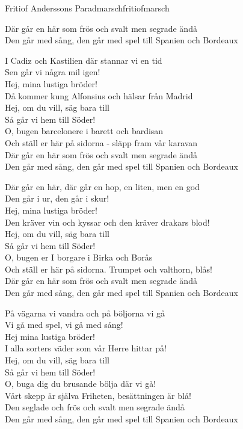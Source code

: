 \begin{song}{Fritiof Anderssons Paradmarsch}{fritiofmarsch}
\begin{vers}
Där går en här som frös och svalt men segrade ändå\\
Den går med sång, den går med spel till Spanien och Bordeaux\\
\end{vers}
\begin{vers}
I Cadiz och Kastilien där stannar vi en tid\\
Sen går vi några mil igen!\\
Hej, mina lustiga bröder!\\
Då kommer kung Alfonsius och hälsar från Madrid\\
Hej, om du vill, säg bara till\\
Så går vi hem till Söder!\\
O, bugen barcelonere i barett och bardisan\\
Och ställ er här på sidorna - släpp fram vår karavan\\
Där går en här som frös och svalt men segrade ändå\\
Den går med sång, den går med spel till Spanien och Bordeaux\\
\end{vers}
\newp
\begin{vers}
Där går en här, där går en hop, en liten, men en god\\
Den går i ur, den går i skur!\\
Hej, mina lustiga bröder!\\
Den kräver vin och kyssar och den kräver drakars blod!\\
Hej, om du vill, säg bara till\\
Så går vi hem till Söder!\\
O, bugen er I borgare i Birka och Borås\\
Och ställ er här på sidorna. Trumpet och valthorn, blås!\\
Där går en här som frös och svalt men segrade ändå\\
Den går med sång, den går med spel till Spanien och Bordeaux\\
\end{vers}
\begin{vers}
På vägarna vi vandra och på böljorna vi gå\\
Vi gå med spel, vi gå med sång!\\
Hej mina lustiga bröder!\\
I alla sorters väder som vår Herre hittar på!\\
Hej, om du vill, säg bara till\\
Så går vi hem till Söder!\\
O, buga dig du brusande bölja där vi gå!\\
Vårt skepp är själva Friheten, besättningen är blå!\\
Den seglade och frös och svalt men segrade ändå\\
Den går med sång, den går med spel till Spanien och Bordeaux\\
\end{vers}
\end{song}
